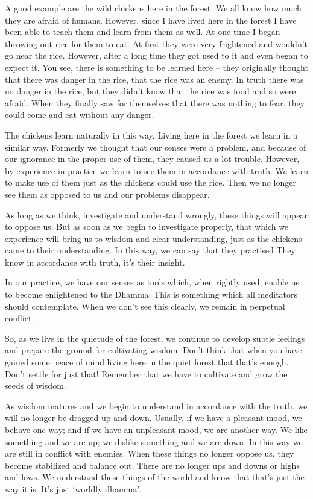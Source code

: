 A good example are the wild chickens here in the forest. We all know how much they are afraid of humans. However, since I have lived here in the forest I have been able to teach them and learn from them as well. At one time I began throwing out rice for them to eat. At first they were very frightened and wouldn't go near the rice. However, after a long time they got used to it and even began to expect it. You see, there is something to be learned here -- they originally thought that there was danger in the rice, that the rice was an enemy. In truth there was no danger in the rice, but they didn't know that the rice was food and so were afraid. When they finally saw for themselves that there was nothing to fear, they could come and eat without any danger. 

The chickens learn naturally in this way. Living here in the forest we learn in a similar way. Formerly we thought that our senses were a problem, and because of our ignorance in the proper use of them, they caused us a lot trouble. However, by experience in practice we learn to see them in accordance with truth. We learn to make use of them just as the chickens could use the rice. Then we no longer see them as opposed to us and our problems disappear.

As long as we think, investigate and understand wrongly, these things will appear to oppose us. But as soon as we begin to investigate properly, that which we experience will bring us to wisdom and clear understanding, just as the chickens came to their understanding. In this way, we can say that they practised  They know in accordance with truth, it's their insight. 

In our practice, we have our senses as tools which, when rightly used, enable us to become enlightened to the Dhamma. This is something which all meditators should contemplate. When we don't see this clearly, we remain in perpetual conflict. 

So, as we live in the quietude of the forest, we continue to develop subtle feelings and prepare the ground for cultivating wisdom. Don't think that when you have gained some peace of mind living here in the quiet forest that that's enough. Don't settle for just that! Remember that we have to cultivate and grow the seeds of wisdom. 

As wisdom matures and we begin to understand in accordance with the truth, we will no longer be dragged up and down. Usually, if we have a pleasant mood, we behave one way; and if we have an unpleasant mood, we are another way. We like something and we are up; we dislike something and we are down. In this way we are still in conflict with enemies. When these things no longer oppose us, they become stabilized and balance out. There are no longer ups and downs or highs and lows. We understand these things of the world and know that that's just the way it is. It's just `worldly dhamma'. 

